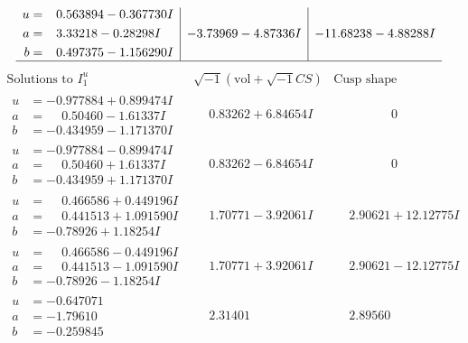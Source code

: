 \documentclass[1p]{elsarticle_modified}
\theoremstyle{definition}
\newcommand{\I}{\sqrt{-1}}
\begin{document}
$$\begin{array}{c|c|c}
\begin{aligned}
u &= \phantom{-}0.563894 - 0.367730 I \\
a &= \phantom{-}3.33218 - 0.28298 I \\
b &= \phantom{-}0.497375 - 1.156290 I\end{aligned}
 & -3.73969 - 4.87336 I & -11.68238 - 4.88288 I\\
 \hline 
 \end{array}$$\newpage$$\begin{array}{c|c|c}  
\text{Solutions to }I^u_{1}& \I (\text{vol} + \sqrt{-1}CS) & \text{Cusp shape}\\
 \hline 
\begin{aligned}
u &= -0.977884 + 0.899474 I \\
a &= \phantom{-}0.50460 - 1.61337 I \\
b &= -0.434959 - 1.171370 I\end{aligned}
 & \phantom{-}0.83262 + 6.84654 I & \phantom{-0.000000 } 0 \\ \hline\begin{aligned}
u &= -0.977884 - 0.899474 I \\
a &= \phantom{-}0.50460 + 1.61337 I \\
b &= -0.434959 + 1.171370 I\end{aligned}
 & \phantom{-}0.83262 - 6.84654 I & \phantom{-0.000000 } 0 \\ \hline\begin{aligned}
u &= \phantom{-}0.466586 + 0.449196 I \\
a &= \phantom{-}0.441513 + 1.091590 I \\
b &= -0.78926 + 1.18254 I\end{aligned}
 & \phantom{-}1.70771 - 3.92061 I & \phantom{-}2.90621 + 12.12775 I \\ \hline\begin{aligned}
u &= \phantom{-}0.466586 - 0.449196 I \\
a &= \phantom{-}0.441513 - 1.091590 I \\
b &= -0.78926 - 1.18254 I\end{aligned}
 & \phantom{-}1.70771 + 3.92061 I & \phantom{-}2.90621 - 12.12775 I \\ \hline\begin{aligned}
u &= -0.647071\phantom{ +0.000000I} \\
a &= -1.79610\phantom{ +0.000000I} \\
b &= -0.259845\phantom{ +0.000000I}\end{aligned}
 & \phantom{-}2.31401\phantom{ +0.000000I} & \phantom{-}2.89560\phantom{ +0.000000I} \\ \hline\begin{aligned}

\end{aligned}
\end{array}$$
\end{document}
